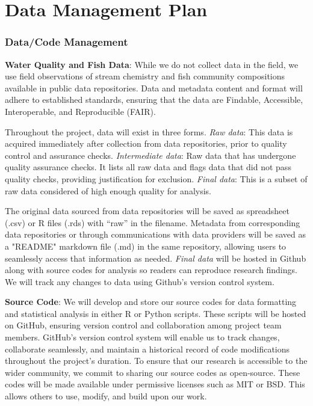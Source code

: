 \documentclass[12pt, class=article, crop=false]{standalone}
\begin{document}
\section*{Data Management Plan}

\subsubsection*{Data/Code Management}

\textbf{Water Quality and Fish Data}: While we do not collect data in the field, we use field observations of stream chemistry and fish community compositions available in public data repositories. Data and metadata content and format will adhere to established standards, ensuring that the data are Findable, Accessible, Interoperable, and Reproducible (FAIR).

Throughout the project, data will exist in three forms.
\textit{Raw data}: This data is acquired immediately after collection from data repositories, prior to quality control and assurance checks.
\textit{Intermediate data}: Raw data that has undergone quality assurance checks.
It lists all raw data and flags data that did not pass quality checks, providing justification for exclusion.
\textit{Final data}: This is a subset of raw data considered of high enough quality for analysis.

The original data sourced from data repositories will be saved as spreadsheet (.csv) or R files (.rds) with ``raw'' in the filename.
Metadata from corresponding data repositories or through communications with data providers will be saved as a "README" markdown file (.md) in the same repository, allowing users to seamlessly access that information as needed.
\textit{Final data} will be hosted in Github along with source codes for analysis so readers can reproduce research findings.
We will track any changes to data using Github's version control system.

\textbf{Source Code}: We will develop and store our source codes for data formatting and statistical analysis in either R or Python scripts.
These scripts will be hosted on GitHub, ensuring version control and collaboration among project team members. 
GitHub's version control system will enable us to track changes, collaborate seamlessly, and maintain a historical record of code modifications throughout the project's duration.
To ensure that our research is accessible to the wider community, we commit to sharing our source codes as open-source. These codes will be made available under permissive licenses such as MIT or BSD. This allows others to use, modify, and build upon our work.
\end{document}
